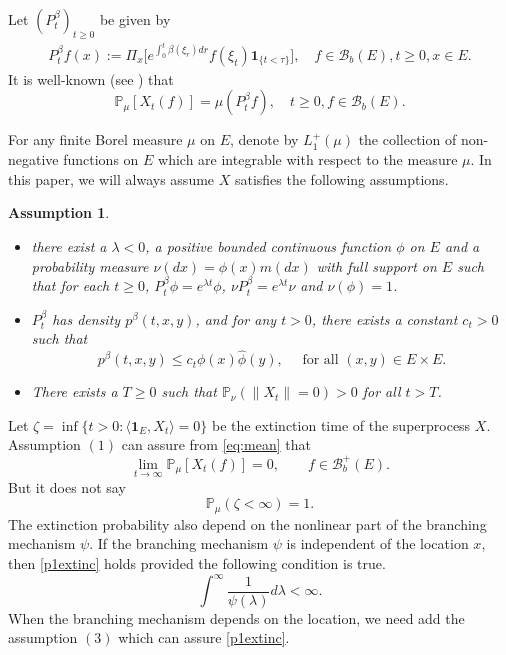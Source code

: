 \documentclass[12pt,a4paper]{amsart}
\numberwithin{equation}{section}
\theoremstyle{plain}
\newtheorem{asp:mean}{Assumption}[section]
\theoremstyle{definition}
\theoremstyle{remark}
\begin{document}
	Let $(P_t^\beta)_{t\geq 0}$ be given by
\begin{align}
	P_t^\beta f(x)
	:= \Pi_x\Big[e^{\int_0^t \beta(\xi_r)dr }f(\xi_t) \mathbf 1_{\{t < \tau\}}\Big],
	\quad f\in \mathcal B_b(E), t\geq 0, x\in E.
\end{align}
	It is well-known (see \cite[Proposition 2.27]{Li2011MeasureValued}) that %
\begin{equation} \label{eq:mean}
	\mathbb P_\mu[X_t(f)] = \mu (P_t^\beta f),
	\quad t\geq 0, f \in \mathcal B_b(E).
\end{equation}

	For any finite Borel measure $\mu$ on $E$, denote by $L_1^+(\mu)$ the collection of non-negative functions on $E$ which are integrable with respect to the measure $\mu$. %
In this paper, we will always assume $X$ satisfies the following assumptions.
\begin{asp:mean}\label{asp:mean}
\begin{itemize}
\item[(1)] there exist a $\lambda<0$, a positive bounded continuous function $\phi$ on $E$ and a probability measure $\nu(dx)=\hat\phi(x)m(dx)$ with full support on $E$ such that for each $t\geq 0$, $P_t^\beta \phi = e^{\lambda t}\phi$, $\nu P_t^\beta = e^{\lambda t} \nu$ and $\nu(\phi) = 1$.
\item[(2)] { \color{gray} $P_t^\beta$ has density $p^\beta(t, x, y)$, and for any $t>0$, there exists
     a constant $c_t>0$ such that
    $$
    p^\beta(t, x, y)\le c_t\phi(x)\hat{\phi}(y), \quad \mbox{ for all }  (x, y)\in E\times E.
    $$
}
\item[(3)] There exists a $T\geq 0$ such that $\mathbb P_\nu(\|X_t\| = 0)>0$ for all $t> T$.
\end{itemize}

\end{asp:mean}
{\color{gray}
Let  $\zeta=\inf\{t>0: \langle \mathbf 1_E,X_t\rangle=0\}$ be the extinction time of the superprocess $X$.  Assumption $(1)$ can assure from \eqref{eq:mean} that
\[
\lim_{t\to\infty}\mathbb P_\mu[X_t(f)]=0, \qquad f \in \mathcal B_b^+(E).
\]
But it does not say
\begin{equation}\label{p1extinc}
	\mathbb P_\mu(\zeta<\infty)=1.
\end{equation}
The extinction probability also depend on the nonlinear part of the branching mechanism $\psi$. If the branching mechanism $\psi$ is independent of the location $x$, then \eqref{p1extinc} holds provided the following condition  is true.
\begin{equation}\label{extinc assump  for continuous}
	\int^\infty\frac{1}{\psi(\lambda)}d\lambda<\infty.
\end{equation}
When the branching mechanism depends on the location, we need add the assumption $(3)$ which can assure \eqref{p1extinc}. 
}
\end{document}
